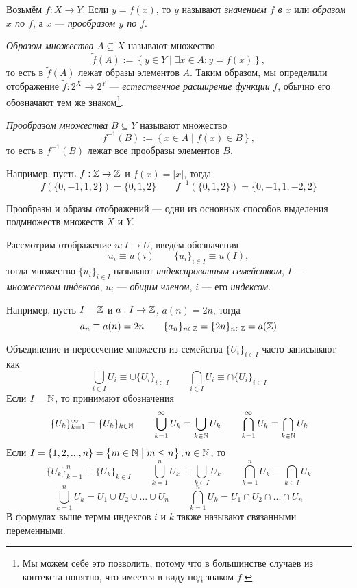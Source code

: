 Возьмём ${f:X\to Y}$. Если ${y=f(x)}$, то $y$ называют {\it значением $f$ в $x$}
 или {\it образом $x$ по $f$},
а $x$ --- {\it прообразом $y$ по $f$}.

{\it Образом множества} $A\subseteq X$
называют множество
\[
  \widetilde f(A):=\left\{y\in Y\;\big|\; \exists x\in A:y=f(x)\right\},
\]
то есть в $\widetilde f(A)$ лежат образы элементов $A$. Таким образом, мы определили
отображение $\widetilde f:2^{X}\to 2^{Y}$ ---
{\it естественное расширение функции}
$f$, обычно его обозначают
тем же знаком\footnote{Мы можем себе это позволить, потому что
  в большинстве случаев из контекста понятно, что имеется
  в виду под знаком $f$.}.

{\it Прообразом множества}
$B\subseteq Y$ называют множество
\[
  f^{-1}(B):=\left\{x\in A\;\big|\; f(x)\in B\right\},
\]
то есть в $f^{-1}(B)$ лежат все прообразы элементов $B$.

Например, пусть $f:\mathbb Z\to\mathbb Z$ и $f(x)=|x|$, тогда
\[
  f(\{0,-1,1,2\})=\{0,1,2\}\qquad f^{-1}(\{0,1,2\})=\{0,-1,1,-2,2\}
\]

Прообразы и образы отображений --- одни из основных способов выделения
подмножеств множеств $X$ и $Y$.

Рассмотрим отображение $u:I\to U$, введём обозначения
\[
  u_{i}\equiv u(i)\qquad \{u_{i}\}_{i\in I}\equiv u(I),
\]
тогда множество $\{u_{i}\}_{i\in I}$ называют {\it индексированным семейством},
$I$ --- {\it множеством индексов}, $u_{i}$ --- {\it общим членом},
$i$ --- его {\it индексом}.

Например, пусть $I=\mathbb Z$ и $a:I\to \mathbb Z$, $a(n)=2n$, тогда
\[
  a_{n}\equiv a(n)=2n\qquad \{a_{n}\}_{n\in\mathbb Z}=\{2n\}_{n\in\mathbb Z}=a(\mathbb Z)
\]

Объединение и пересечение множеств из семейства $\{U_{i}\}_{i\in I}$
часто записывают как
\[
  \bigcup_{i\in I}U_{i}\equiv\cup \{U_{i}\}_{i\in I}\qquad
  \bigcap_{i\in I}U_{i}\equiv\cap \{U_{i}\}_{i\in I}
\]
Если $I=\mathbb N$, то принимают обозначения
\[
  \{U_{k}\}_{k=1}^{\infty}\equiv\{U_{k}\}_{k\in\mathbb N}\qquad
  \bigcup_{k=1}^{\infty}U_{k}\equiv\bigcup_{k\in\mathbb N}U_{k}\qquad
  \bigcap_{k=1}^{\infty}U_{k}\equiv\bigcap_{k\in\mathbb N}U_{k}
\]
Если $I=\{1,2,...,n\}=\left\{m\in\mathbb N\;\big|\;m\leq n\right\},n\in\mathbb N$, то
\[
  \{U_{k}\}_{k=1}^{n}\equiv\{U_{k}\}_{k\in I}\qquad
  \bigcup_{k=1}^{n}U_{k}\equiv\bigcup_{k\in I}U_{k}\qquad
  \bigcap_{k=1}^{n}U_{k}\equiv\bigcap_{k\in I}U_{k}
\]
\[
  \bigcup_{k=1}^{n}U_{k}=U_1\cup U_2\cup ...\cup U_{n}\qquad
  \bigcap_{k=1}^{n}U_{k}=U_1\cap U_2\cap ...\cap U_{n}
\]
В формулах выше термы индексов $i$ и $k$ также называют связанными переменными.

